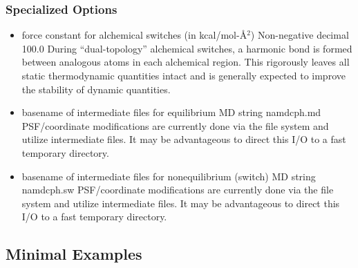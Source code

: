 \subsubsection{Specialized Options}
\begin{itemize}
\item {}
{force constant for alchemical switches (in kcal/mol-\AA$^2$)}
{Non-negative decimal}
{100.0}
{
During ``dual-topology'' alchemical switches, a harmonic bond is formed between
  analogous atoms in each alchemical region.
This rigorously leaves all static thermodynamic quantities intact and is
  generally expected to improve the stability of dynamic quantities.
}

\item {}
{basename of intermediate files for equilibrium MD}
{string}
{namdcph.md}
{
PSF/coordinate modifications are currently done via the file system and utilize 
  intermediate files.
It may be advantageous to direct this I/O to a fast temporary directory.
}

\item {}
{basename of intermediate files for nonequilibrium (switch) MD}
{string}
{namdcph.sw}
{
PSF/coordinate modifications are currently done via the file system and utilize
  intermediate files.
It may be advantageous to direct this I/O to a fast temporary directory.
}
\end{itemize}


\subsection{Minimal Examples}

